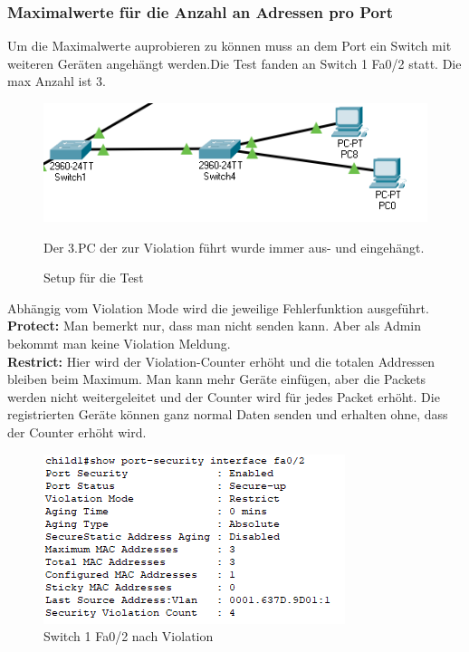 \subsubsection{Maximalwerte für die Anzahl an Adressen pro Port}
Um die Maximalwerte auprobieren zu können muss an dem Port ein Switch mit weiteren Geräten angehängt werden.Die Test fanden an Switch 1 Fa0/2 statt. Die max Anzahl ist 3.\\
\begin{figure}[!htb]
    \centering
    \includegraphics[width=.95\textwidth,height=.5\textwidth,keepaspectratio]{./img/config/max address/Protect_conf.png}
    \caption{Setup für die Test}
    Der 3.PC der zur Violation führt wurde immer aus- und eingehängt.
\end{figure}
\clearpage
\pagebreak
Abhängig vom Violation Mode wird die jeweilige Fehlerfunktion ausgeführt.
\vspace{5pt}
\\
\textbf{Protect:} Man bemerkt nur, dass man nicht senden kann. Aber als Admin bekommt man keine Violation Meldung.
\\
\textbf{Restrict:} Hier wird der Violation-Counter erhöht und die totalen Addressen bleiben beim Maximum. Man kann mehr Geräte einfügen, aber die Packets werden nicht weitergeleitet und der Counter wird für jedes Packet erhöht. Die registrierten Geräte können ganz normal Daten senden und erhalten ohne, dass der Counter erhöht wird.
\begin{figure}[!htb]
    \centering
    \includegraphics[width=.95\textwidth,keepaspectratio]{./img/config/max address/Protect.png}
    \caption{Switch 1 Fa0/2 nach Violation}
\end{figure}
